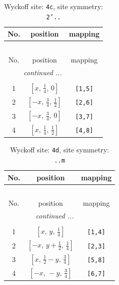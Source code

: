\documentclass[fleqn,8pt]{jsarticle}
\begin{document}
\renewcommand{\arraystretch}{1.2}
\begin{longtable}{ccc}
\caption{Wyckoff site: {\tt 4c}, site symmetry: {\tt 2'..}}
 \\
 \hline \hline
No. & position & mapping \\ \hline \endfirsthead

\multicolumn{2}{l}{\tablename\ \thetable{}} \\
 \hline \hline
No. & position & mapping \\ \hline \endhead

 \hline \hline
\multicolumn{2}{r}{\footnotesize\it continued ...} \\ \endfoot

 \hline \hline
\multicolumn{2}{r}{} \\ \endlastfoot

1 & $\left[ x,\, \frac{1}{4},\, 0 \right]$ & {\tt [1,5]} \\ \hline
2 & $\left[ - x,\, \frac{3}{4},\, \frac{1}{2} \right]$ & {\tt [2,6]} \\ \hline
3 & $\left[ - x,\, \frac{3}{4},\, 0 \right]$ & {\tt [3,7]} \\ \hline
4 & $\left[ x,\, \frac{1}{4},\, \frac{1}{2} \right]$ & {\tt [4,8]} \\
\end{longtable}
\renewcommand{\arraystretch}{1.2}
\begin{longtable}{ccc}
\caption{Wyckoff site: {\tt 4d}, site symmetry: {\tt ..m}}
 \\
 \hline \hline
No. & position & mapping \\ \hline \endfirsthead

\multicolumn{2}{l}{\tablename\ \thetable{}} \\
 \hline \hline
No. & position & mapping \\ \hline \endhead

 \hline \hline
\multicolumn{2}{r}{\footnotesize\it continued ...} \\ \endfoot

 \hline \hline
\multicolumn{2}{r}{} \\ \endlastfoot

1 & $\left[ x,\, y,\, \frac{1}{4} \right]$ & {\tt [1,4]} \\ \hline
2 & $\left[ - x,\, y + \frac{1}{2},\, \frac{1}{4} \right]$ & {\tt [2,3]} \\ \hline
3 & $\left[ x,\, \frac{1}{2} - y,\, \frac{3}{4} \right]$ & {\tt [5,8]} \\ \hline
4 & $\left[ - x,\, - y,\, \frac{3}{4} \right]$ & {\tt [6,7]} \\
\end{longtable}
\end{document}
